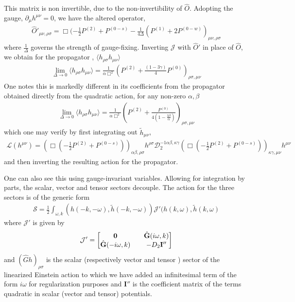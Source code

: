 \documentclass[aps,preprintnumbers,superscriptaddress,longbibliography]{revtex4-1}
\begin{document}
This matrix is non invertible, due to the non-invertibility of $\hat{O}$. Adopting the gauge, $\partial_{\mu}h^{\mu\nu}=0$, we have the altered operator, 
 \begin{align}
   \hat{O}'_{\mu\nu,\rho\sigma}=\Box(-\frac{1}{2}P^{(2)}+P^{(0-s)}-\frac{1}{4\Delta}(P^{(1)}+2P^{(0-w)})_{\mu\nu,\rho\sigma} 
\end{align}
where $\frac{1}{\Delta}$ governs the strength of gauge-fixing. Inverting $\mathcal{J}$ with $\hat{O}'$ in place of $\hat{O}$, we obtain for the propagator , $\langle h_{\rho\sigma }h_{\mu\nu}\rangle$
\begin{align}
   \lim_{\Delta\rightarrow0} \langle h_{\rho\sigma }h_{\mu\nu}\rangle=\frac{1}{\alpha\Box^2}(P^{(2)}+\frac{(1-3\gamma)}{4}P^{(0)})_{\rho\sigma,\mu\nu}
\end{align}
One notes this is markedly different in its coefficients from the propagator obtained directly from the quadratic action, for any non-zero $\alpha,\beta$
\begin{align}
   \label{eq:2ppp}\lim_{\Delta\rightarrow0} \langle h_{\rho\sigma }h_{\mu\nu}\rangle=\frac{1}{\alpha\Box^2}(P^{(2)}+\frac{P^{(0)}}{4(1-\frac{3\beta}{\alpha})})_{\rho\sigma,\mu\nu}
\end{align} which one may verify by first integrating out $\tilde{h}_{\mu\nu}$,
\begin{align}
 \mathcal{L}(h^{\mu\nu})=   (\Box(-\frac{1}{2}P^{(2)}+P^{(0-s)}))_{\alpha\beta,\rho\sigma}h^{\rho\sigma}\mathcal{D}_2^{-1\alpha\beta,\kappa\gamma}(\Box(-\frac{1}{2}P^{(2)}+P^{(0-s)}))_{\kappa\gamma,\mu\nu}h^{\mu\nu}
\end{align}
and then inverting the resulting action for the propagator.

One can also see this using gauge-invariant variables. Allowing for integration by parts, the scalar, vector and tensor sectors decouple. The action for the three sectors is of the generic form
\begin{align}
    \mathcal{S}=\frac{1}{2}\int_{\omega,k}(h(-k,-\omega),\tilde{h}(-k,-\omega))\mathcal{J}'(h(k,\omega),\tilde{h}(k,\omega)
\end{align}
where $\mathcal{J}'$ is given by 
\begin{align}
  \mathcal{J}'=  
\begin{bmatrix}
    \bf0 &&\hat{\bf G}(i\omega,k)\\\hat{\bf G}(-i\omega,k) && -D_{2}\bf I''
\end{bmatrix}
\end{align}
and $(\hat{ G} h)_{\rho\sigma}$ is  the scalar (respectively vector and tensor ) sector of the linearized Einstein action to which we have added an infinitesimal term of the form $i\omega$ for regularization purposes and $\mathbf{I''}$ is the coefficient matrix of the terms quadratic in scalar (vector and tensor) potentials. 
\end{document}
